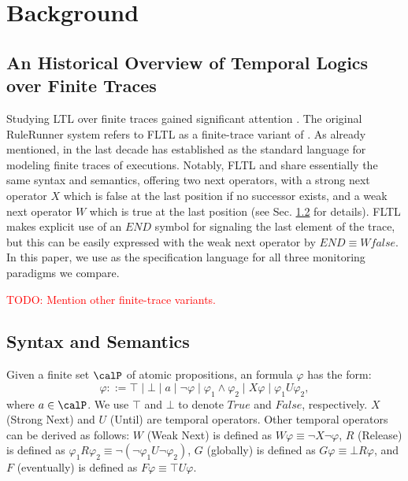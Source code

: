 \section{Background}

\subsection{An Historical Overview of Temporal Logics over Finite Traces}
\label{sec:overview}

Studying LTL over finite traces gained significant attention \cite{lichtenstein1985glory,manna1995temporal}. The original RuleRunner system \cite{perotti2015runtime} refers to FLTL as a finite-trace variant of \ltl. As already mentioned, in the last decade \ltlf has established as the standard language for modeling finite traces of executions. Notably, FLTL and \ltlf share essentially the same syntax and semantics, offering two next operators, with a strong next operator $X$ which is false at the last position if no successor exists, and a weak next operator $W$ which is true at the last position (see Sec. \ref{sec:ltlf} for details). FLTL makes explicit use of an $\textit{END}$ symbol for signaling the last element of the trace, but this can be easily expressed with the weak next operator by $\textit{END} \equiv W  false$.  %
In this paper, we use \ltlf as the specification language for all three monitoring paradigms we compare.

\noindent
\textcolor{red}{TODO: Mention other finite-trace variants.}

\subsection{Syntax and Semantics}
\label{sec:ltlf}

Given a finite set $\calP$ of atomic propositions, an \ltlf formula $\varphi$ has the form:
\[
    \varphi ::= \top \mid
    \bot
    \mid 
    a
    \mid
    \lnot\varphi
    \mid
    \varphi_1\land\varphi_2
    \mid
    X\varphi
    \mid
    \varphi_1 U\varphi_2,
\]
where $a \in \calP$. We use $\top$ and $\bot$ to denote $True$ and $False$, respectively. $X$ (Strong Next) and $U$ (Until) are temporal operators. Other temporal operators can be derived as follows: $W$ (Weak Next) is defined as $W \varphi \equiv \neg X\neg\varphi$, $R$ (Release) is defined as $\varphi_1 R \varphi_2 \equiv \neg(\neg\varphi_1 U \neg\varphi_2 )$, $G$ (globally) is defined as $G\varphi \equiv \bot R\varphi$, and $F$ (eventually) is defined as $F \varphi \equiv \top U \varphi$.

